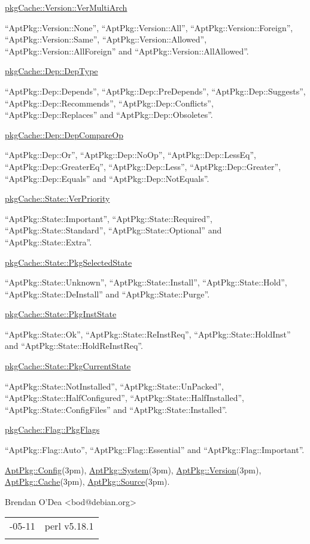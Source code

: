 \documentclass[]{article}
\renewcommand{\emph}[1]{\underline{#1}}
\begin{document}
\emph{pkgCache::Version::VerMultiArch}

``AptPkg::Version::None'', ``AptPkg::Version::All'',
``AptPkg::Version::Foreign'', ``AptPkg::Version::Same'',
``AptPkg::Version::Allowed'', ``AptPkg::Version::AllForeign'' and
``AptPkg::Version::AllAllowed''.

\emph{pkgCache::Dep::DepType}

``AptPkg::Dep::Depends'', ``AptPkg::Dep::PreDepends'',
``AptPkg::Dep::Suggests'', ``AptPkg::Dep::Recommends'',
``AptPkg::Dep::Conflicts'', ``AptPkg::Dep::Replaces'' and
``AptPkg::Dep::Obsoletes''.

\emph{pkgCache::Dep::DepCompareOp}

``AptPkg::Dep::Or'', ``AptPkg::Dep::NoOp'', ``AptPkg::Dep::LessEq'',
``AptPkg::Dep::GreaterEq'', ``AptPkg::Dep::Less'',
``AptPkg::Dep::Greater'', ``AptPkg::Dep::Equals'' and
``AptPkg::Dep::NotEquals''.

\emph{pkgCache::State::VerPriority}

``AptPkg::State::Important'', ``AptPkg::State::Required'',
``AptPkg::State::Standard'', ``AptPkg::State::Optional'' and
``AptPkg::State::Extra''.

\emph{pkgCache::State::PkgSelectedState}

``AptPkg::State::Unknown'', ``AptPkg::State::Install'',
``AptPkg::State::Hold'', ``AptPkg::State::DeInstall'' and
``AptPkg::State::Purge''.

\emph{pkgCache::State::PkgInstState}

``AptPkg::State::Ok'', ``AptPkg::State::ReInstReq'',
``AptPkg::State::HoldInst'' and ``AptPkg::State::HoldReInstReq''.

\emph{pkgCache::State::PkgCurrentState}

``AptPkg::State::NotInstalled'', ``AptPkg::State::UnPacked'',
``AptPkg::State::HalfConfigured'', ``AptPkg::State::HalfInstalled'',
``AptPkg::State::ConfigFiles'' and ``AptPkg::State::Installed''.

\emph{pkgCache::Flag::PkgFlags}

``AptPkg::Flag::Auto'', ``AptPkg::Flag::Essential'' and
``AptPkg::Flag::Important''.


\emph{AptPkg::Config}(3pm), \emph{AptPkg::System}(3pm),
\emph{AptPkg::Version}(3pm), \emph{AptPkg::Cache}(3pm),
\emph{AptPkg::Source}(3pm).


Brendan O'Dea \textless{}bod@debian.org\textgreater{}

\begin{longtable}[c]{@{}ll@{}}
\toprule\addlinespace
2013-05-11 & perl v5.18.1
\\\addlinespace
\bottomrule
\end{longtable}
\end{document}

